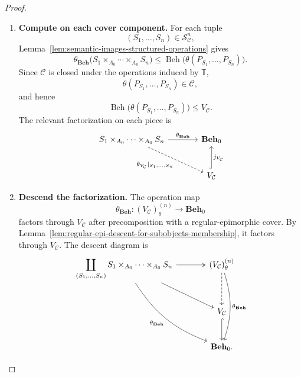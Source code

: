 \begin{proof}
\begin{enumerate}
        \item \textbf{Compute on each cover component.}
        For each tuple
        \[
            (S_1,\dots,S_n)
            \in
            \mathcal S_{\mathcal C}^n,
        \]
        Lemma~\ref{lem:semantic-images-structured-operations} gives
        \[
            \theta_{\mathbf{Beh}}
            \bigl(
            S_1\times_{A_0}\cdots\times_{A_0}S_n
            \bigr)
            \leq
            \operatorname{Beh}
            \bigl(
            \theta(P_{S_1},\dots,P_{S_n})
            \bigr).
        \]
        Since \(\mathcal C\) is closed under the operations induced by
        \(\mathbb T\),
        \[
            \theta(P_{S_1},\dots,P_{S_n})\in\mathcal C,
        \]
        and hence
        \[
            \operatorname{Beh}
            \bigl(
            \theta(P_{S_1},\dots,P_{S_n})
            \bigr)
            \leq
            V_{\mathcal C}.
        \]
        The relevant factorization on each piece is
\[
\begin{tikzcd}[column sep=large, row sep=large]
    S_1\times_{A_0}\cdots\times_{A_0}S_n
        \arrow[r, "{\theta_{\mathbf{Beh}}}"]
        \arrow[dr, dashed, "{\theta_{V_{\mathcal C}}|_{S_1,\dots,S_n}}"']
    &
    \mathbf{Beh}_0
    \\
    &
    V_{\mathcal C}
        \arrow[u, hook, "j_{V_{\mathcal C}}"']
\end{tikzcd}
\]

        \item \textbf{Descend the factorization.}
        The operation map
        \[
            \theta_{\mathbf{Beh}}:
            (V_{\mathcal C})^{(n)}_\theta\to\mathbf{Beh}_0
        \]
        factors through \(V_{\mathcal C}\) after precomposition with a
        regular-epimorphic cover. By
        Lemma~\ref{lem:regular-epi-descent-for-subobjects-membership}, it factors through
        \(V_{\mathcal C}\). The descent diagram is
        \[
        \begin{tikzcd}[column sep=large, row sep=large]
            \displaystyle
            \coprod_{(S_1,\dots,S_n)}
            S_1\times_{A_0}\cdots\times_{A_0}S_n
                \arrow[r, two heads]
                \arrow[dr]
                \arrow[ddr, bend right=18, "\theta_{\mathbf{Beh}}"']
            &
            (V_{\mathcal C})^{(n)}_\theta
                \arrow[d, dashed]
                \arrow[dd, bend left=18, "\theta_{\mathbf{Beh}}"]
            \\
            &
            V_{\mathcal C}
                \arrow[d, hook]
            \\
            &
            \mathbf{Beh}_0 .
        \end{tikzcd}
        \]


\end{enumerate}
\end{proof}
